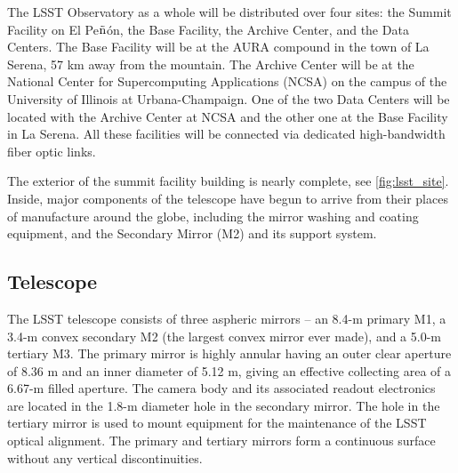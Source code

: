 The LSST Observatory as a whole will be distributed over four sites: the Summit Facility on El Pe$\tilde{\mbox n}$\'{o}n, the Base Facility, the Archive Center, and the Data Centers. The Base Facility will be at the AURA compound in the town of La Serena, 57 km away from the mountain. The Archive Center will be at the National Center for Supercomputing Applications (NCSA) on the campus of the University of Illinois at Urbana-Champaign. One of the two Data Centers will be located with the Archive Center at NCSA and the other one at the Base Facility in La Serena. All these facilities will be connected via dedicated high-bandwidth fiber optic links.

The exterior of the summit facility building is nearly complete, see \autoref{fig:lsst_site}. Inside, major components of the telescope have begun to arrive from their places of manufacture around the globe, including the mirror washing and coating equipment, and the Secondary Mirror (M2) and its support system.
\subsection{Telescope}
The LSST telescope consists of three aspheric mirrors -- an 8.4-m primary M1, a 3.4-m convex secondary M2 (the largest convex mirror ever made), and a 5.0-m tertiary M3. The primary mirror is highly annular having an outer clear aperture of 8.36 m and an inner diameter of 5.12 m, giving an effective collecting area of a 6.67-m filled aperture. The camera body and its associated readout electronics are located in the 1.8-m diameter hole in the secondary mirror.  The hole in the tertiary mirror is used to mount equipment for the maintenance of the LSST optical alignment. The primary and tertiary mirrors form a continuous surface without any vertical discontinuities.

